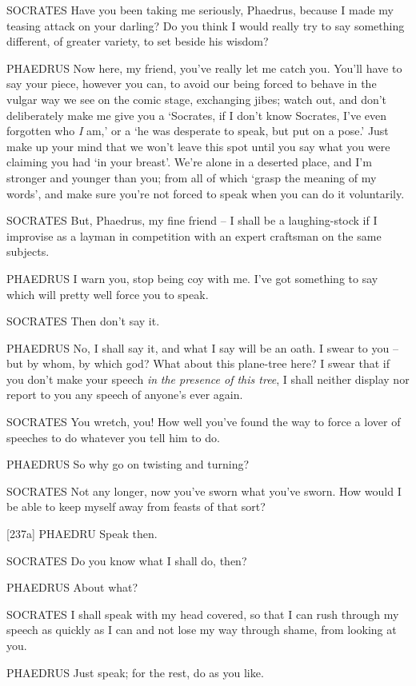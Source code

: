 SOCRATES Have you been taking me seriously, Phaedrus,  because I
made my teasing attack on your darling? Do you think I would really try
to say something different, of greater variety, to set beside his
wisdom?

PHAEDRUS Now here, my friend, you've really let me catch  you.
You'll have to say your piece, however you can, to avoid our being
forced to behave in the vulgar way we see on the comic stage, exchanging
jibes; watch out, and don't deliberately  make me give you a
‘Socrates, if I don't know Socrates, I've even forgotten who {\em I}
am,' or a ‘he was desperate to speak, but put on a pose.' Just make up
your mind that we won't leave this spot until you say what you were
claiming you had ‘in your  breast'. We're alone in a deserted
place, and I'm stronger and younger than you; from all of which ‘grasp
the meaning of my words',
and make sure you're not forced to speak when you can do it voluntarily.

SOCRATES But, Phaedrus, my fine friend -- I shall be a laughing-stock
 if I improvise as a layman in competition with an expert
craftsman on the same
subjects.

PHAEDRUS I warn you, stop being coy with me. I've got something to say
which will pretty well force you to speak.

SOCRATES Then don't say it.

 PHAEDRUS No, I shall say it, and what I say will be an oath. I
 swear to you -- but by whom, by which god? What about this
plane-tree here? I swear that if you don't make your speech {\em in}
{\em the presence of this tree}, I shall neither display nor report to
you any speech of anyone's ever again.

SOCRATES You wretch, you! How well you've found the way to force
a lover of speeches to do whatever you tell him to do.

PHAEDRUS So why go on twisting and turning?

SOCRATES Not any longer, now you've sworn what you've sworn. How would I
be able to keep myself away from feasts of that sort?

{[}237a{]} PHAEDRU Speak then.

SOCRATES Do you know what I shall do, then?

PHAEDRUS About what?

SOCRATES I shall speak with my head covered, so that I can  rush
through my speech as quickly as I can and not lose my way through shame,
from looking at you.

PHAEDRUS Just speak; for the rest, do as you like.

